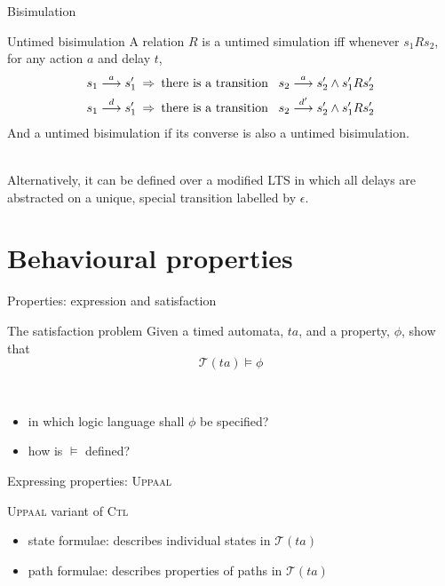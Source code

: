 \documentclass{beamer}
\def\dgold#1{{\darkgoldenrod #1}}
\def\dkb#1{{\blue #1}}
\def\TL#1{\mathcal{T}(#1)}
\begin{document}
\begin{slide}{Bisimulation}
\small

\begin{block}{Untimed bisimulation}
A relation $R$ is a \dkb{untimed simulation} iff whenever $s_1 R s_2$, for any action $a$ and delay $t$,
\begin{align*}
s_1 \stackrel{a}{\longrightarrow} s_1' \; & \mathbin{\Rightarrow}\; \text{there is a transition}\; \; \; s_2 \stackrel{a}{\longrightarrow} s_2' \mathbin{\wedge} s_1' R s_2'\\
s_1 \stackrel{d}{\longrightarrow} s_1'\; & \mathbin{\Rightarrow}\; \text{there is a transition}\; \; \; s_2 \stackrel{d'}{\longrightarrow} s_2' \mathbin{\wedge} s_1' R s_2'
\end{align*}
And a \dkb{untimed bisimulation} if its converse is also a  untimed bisimulation.
\end{block}
~\\


\dgold{Alternatively, it can be defined over a modified LTS in which all delays are abstracted on a 
unique, special transition labelled by $\epsilon$.}
\end{slide}



\section{Behavioural properties}
\begin{slide}{Properties: expression and satisfaction}
\small
\begin{block}{The satisfaction problem }
Given a \dgold{timed automata}, $ta$, and a \dkb{property}, $\phi$, show that
\begin{equation*}
\TL{ta} \models \phi
\end{equation*}
\end{block}
~\\

\pause
\begin{itemize}
\item in which logic language shall $\phi$ be specified?
\item how is $\models$ defined?
\end{itemize}
\end{slide}




\begin{slide}{Expressing properties: \textsc{Uppaal}}
\small

\begin{block}{\textsc{Uppaal} variant of \textsc{Ctl}}
\begin{itemize}
\item \dkb{state formulae}:  describes individual states in $\TL{ta}$
\item \dkb{path formulae}: describes properties of paths in $\TL{ta}$
\end{itemize}
\end{block}

\end{slide}
\end{document}
